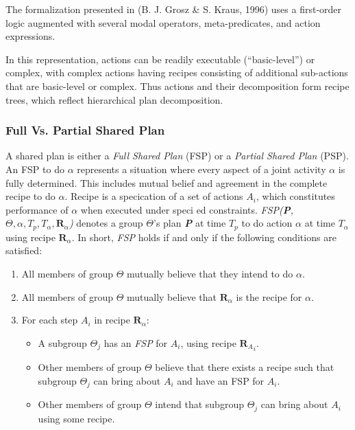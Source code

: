 \documentclass[11pt]{article}
\begin{document}
The formalization presented in (B. J. Grosz & S. Kraus, 1996) uses a first-order
logic augmented with several modal operators, meta-predicates, and action
expressions.

In this representation, actions can be readily executable (“basic-level”) or
complex, with complex actions having recipes consisting of additional
sub-actions that are basic-level or complex. Thus actions and their
decomposition form recipe trees, which reflect hierarchical plan decomposition.



\subsubsection{Full Vs. Partial Shared Plan}
A shared plan is either a \textit{Full Shared Plan} (FSP) or a \textit{Partial
Shared Plan} (PSP). An FSP to do $\alpha$ represents a situation where every
aspect of a joint activity $\alpha$ is fully determined. This includes mutual
belief and agreement in the complete recipe to do $\alpha$. Recipe is a
specication of a set of actions \textit{$A_i$}, which constitutes performance of
$\alpha$ when executed under speci ed constraints. \textit{FSP(\textbf{P},
$\Theta, \alpha, T_p, T_\alpha, \textbf{R}_\alpha$)} denotes a group $\Theta$'s
plan \textit{\textbf{P}} at time \textit{$T_p$} to do action $\alpha$ at time
\textit{$T_\alpha$} using recipe \textit{$\textbf{R}_\alpha$}. In short,
\textit{FSP} holds if and only if the following conditions are satisfied:

\begin{enumerate}
  \item All members of group $\Theta$ mutually believe that they intend to do
  $\alpha$.
  \item All members of group $\Theta$ mutually believe that
  \textit{$\textbf{R}_\alpha$} is the recipe for $\alpha$.
  \item For each step \textit{$A_i$} in recipe \textit{$\textbf{R}_\alpha$}:
  \begin{itemize}
    \item A subgroup $\Theta_j$ has an \textit{FSP} for \textit{$A_i$}, using
    recipe \textit{${\textbf{R}_A}_i$}.
    \item Other members of group $\Theta$ believe that there exists a recipe
    such that subgroup $\Theta_j$ can bring about \textit{$A_i$} and have an FSP
    for \textit{$A_i$}.
    \item Other members of group $\Theta$ intend that subgroup $\Theta_j$ can
    bring about \textit{$A_i$} using some recipe.
  \end{itemize}
\end{enumerate}
\end{document}
